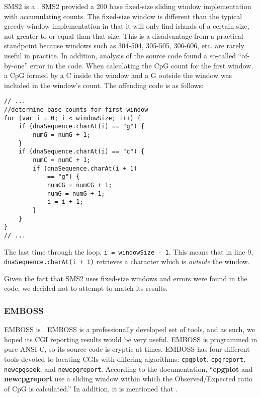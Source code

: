 \documentclass{bioinfo}
\begin{document}
SMS2 is a . SMS2 provided a 200 base fixed-size sliding window
implementation with accumulating counts. The fixed-size window is
different than the typical greedy window implementation in that it
will only find islands of a certain size, not greater to or equal than
that size. This is a disadvantage from a practical standpoint because
windows such as 304-504, 305-505, 306-606, etc. are rarely useful in
practice. In addition, analysis of the source code found a so-called
``of-by-one'' error in the code. When calculating the CpG count for
the first window, a CpG formed by a C inside the window and a G
outside the window was included in the window's count. The offending
code is as follows:
\pagebreak
\begin{verbatim}
// ...
//determine base counts for first window
for (var i = 0; i < windowSize; i++) {
    if (dnaSequence.charAt(i) == "g") {
        numG = numG + 1;
    }
    if (dnaSequence.charAt(i) == "c") {
        numC = numC + 1;
        if (dnaSequence.charAt(i + 1)
            == "g") {
            numCG = numCG + 1;
            numG = numG + 1;
            i = i + 1;
        }
    }
}
// ...
\end{verbatim}

The last time through the loop, \verb|i = windowSize - 1|.
This means that in line 9,
\verb|dnaSequence.charAt(i + 1)|
retrieves a character which is \emph{outside} the window.

Given the fact that SMS2 uses fixed-size windows and errors were found
in the code, we decided not to attempt to match its results.

\subsubsection{EMBOSS}

EMBOSS is . EMBOSS is a professionally developed set of
tools, and as such, we hoped its CGI reporting results would be very
useful. EMBOSS is programmed in pure ANSI C, so its source code is
cryptic at times. EMBOSS has four different tools devoted to locating
CGIs with differing algorithms: \verb|cpgplot|, \verb|cpgreport|,
\verb|newcpgseek|, and \verb|newcpgreport|. According to the
documentation, ``\textbf{cpgplot} and \textbf{newcpgreport} use a
sliding window within which the Observed/Expected ratio of CpG is
calculated.'' In addition, it is mentioned that
.
\end{document}

